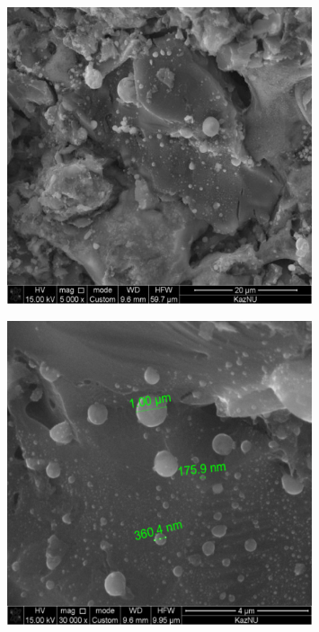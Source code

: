 \begin{figure}[H]
	\centering
	\includegraphics[width=0.8\textwidth]{assets/1070}
	\caption*{}
\end{figure}
\begin{figure}[H]
	\centering
	\includegraphics[width=0.8\textwidth]{assets/1071}
	\caption*{}
\end{figure}
